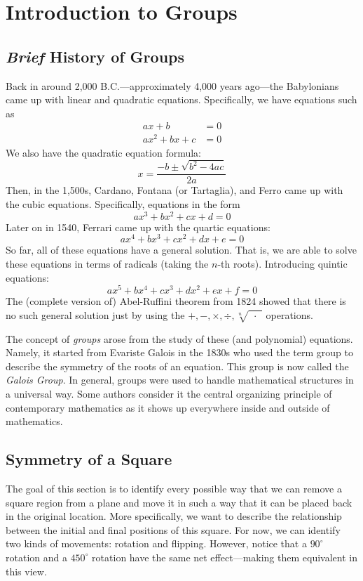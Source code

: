 \chapter{Introduction to Groups}

\section{\textit{Brief} History of Groups}

Back in around 2,000 B.C.---approximately 4,000 years ago---the Babylonians came up with linear and quadratic equations. Specifically, we have equations such as
\[
\begin{aligned}
    ax + b &= 0 \\
    ax^2 + bx + c &= 0
\end{aligned}
\]
We also have the quadratic equation formula:
\[
    x = \frac{-b \pm \sqrt{b^2 - 4ac}}{2a}
\]
Then, in the 1,500s, Cardano, Fontana (or Tartaglia), and Ferro came up with the cubic equations. Specifically, equations in the form
\[
    ax^3 + bx^2 + cx + d = 0
\]
Later on in 1540, Ferrari came up with the quartic equations:
\[
    ax^4 + bx^3 + cx^2 + dx + e = 0
\]
So far, all of these equations have a general solution. That is, we are able to solve these equations in terms of radicals (taking the \(n\)-th roots). Introducing quintic equations:
\[
    ax^5 + bx^4 + cx^3 + dx^2 + ex + f = 0
\]
The (complete version of) Abel-Ruffini theorem from 1824 showed that there is no such general solution just by using the \(+, -, \times, \div, \sqrt[n]{\phantom{(}\cdot\phantom{)}}\) operations.

The concept of \textit{groups} arose from the study of these (and polynomial) equations. Namely, it started from Evariste Galois in the 1830s who used the term group to describe the symmetry of the roots of an equation. This group is now called the \textit{Galois Group}. In general, groups were used to handle mathematical structures in a universal way. Some authors consider it the central organizing principle of contemporary mathematics as it shows up everywhere inside and outside of mathematics.

\section{Symmetry of a Square}

The goal of this section is to identify every possible way that we can remove a square region from a plane and move it in such a way that it can be placed back in the original location. More specifically, we want to describe the relationship between the initial and final positions of this square. For now, we can identify two kinds of movements: rotation and flipping. However, notice that a \(90^\circ\) rotation and a \(450^\circ\) rotation have the same net effect---making them equivalent in this view.


